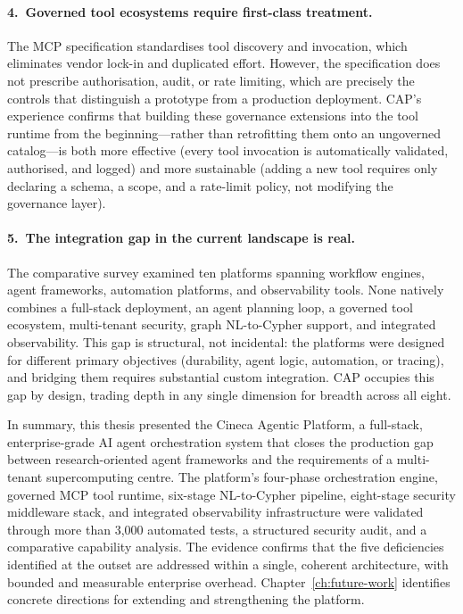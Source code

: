 \documentclass[a4paper]{sapthesis}
\begin{document}
\paragraph{4.\ Governed tool ecosystems require first-class treatment.}
The MCP specification standardises tool discovery and invocation, which
eliminates vendor lock-in and duplicated effort.  However, the
specification does not prescribe authorisation, audit, or rate limiting,
which are precisely the controls that distinguish a prototype from a
production deployment.  CAP's experience confirms that building these
governance extensions into the tool runtime from the beginning---rather
than retrofitting them onto an ungoverned catalog---is both more effective
(every tool invocation is automatically validated, authorised, and logged)
and more sustainable (adding a new tool requires only declaring a schema,
a scope, and a rate-limit policy, not modifying the governance layer).

\paragraph{5.\ The integration gap in the current landscape is real.}
The comparative survey examined ten platforms spanning workflow engines,
agent frameworks, automation platforms, and observability tools.  None
natively combines a full-stack deployment, an agent planning loop, a
governed tool ecosystem, multi-tenant security, graph NL-to-Cypher
support, and integrated observability.  This gap is structural, not
incidental: the platforms were designed for different primary objectives
(durability, agent logic, automation, or tracing), and bridging them
requires substantial custom integration.  CAP occupies this gap by
design, trading depth in any single dimension for breadth across all
eight.

\bigskip
\noindent
In summary, this thesis presented the Cineca Agentic Platform, a
full-stack, enterprise-grade AI agent orchestration system that closes the
production gap between research-oriented agent frameworks and the
requirements of a multi-tenant supercomputing centre.  The platform's
four-phase orchestration engine, governed MCP tool runtime, six-stage
NL-to-Cypher pipeline, eight-stage security middleware stack, and
integrated observability infrastructure were validated through more than
3{,}000 automated tests, a structured security audit, and a comparative
capability analysis.  The evidence confirms that the five deficiencies
identified at the outset are addressed within a single, coherent
architecture, with bounded and measurable enterprise overhead.
Chapter~\ref{ch:future-work} identifies concrete directions for extending
and strengthening the platform.
\end{document}

